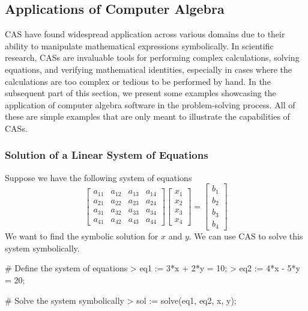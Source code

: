 \subsection{Applications of Computer Algebra}

\ac{CAS} have found widespread application across various domains due to their ability to manipulate mathematical expressions symbolically. In scientific research, \acp{CAS} are invaluable tools for performing complex calculations, solving equations, and verifying mathematical identities, especially in cases where the calculations are too complex or tedious to be performed by hand. In the subsequent part of this section, we present some examples showcasing the application of computer algebra software in the problem-solving process. All of these are simple examples that are only meant to illustrate the capabilities of \acp{CAS}.

\subsubsection{Solution of a Linear System of Equations}

Suppose we have the following system of equations
%
\begin{equation*}
  \begin{bmatrix}
    a_{11} & a_{12} & a_{13} & a_{14} \\
    a_{21} & a_{22} & a_{23} & a_{24} \\
    a_{31} & a_{32} & a_{33} & a_{34} \\
    a_{41} & a_{42} & a_{43} & a_{44}
  \end{bmatrix} \begin{bmatrix}
    x_1 \\ x_2 \\ x_3 \\ x_4
  \end{bmatrix} = \begin{bmatrix}
    b_1 \\ b_2 \\ b_3 \\ b_4
  \end{bmatrix}
\end{equation*}
%
We want to find the symbolic solution for $x$ and $y$. We can use \Maple{} \ac{CAS} to solve this system symbolically.

\begin{mapleinline}
# Define the system of equations
> eq1 := 3*x + 2*y = 10;
> eq2 := 4*x - 5*y = 20;

# Solve the system symbolically
> sol := solve({eq1, eq2}, {x, y});
\end{mapleinline}

